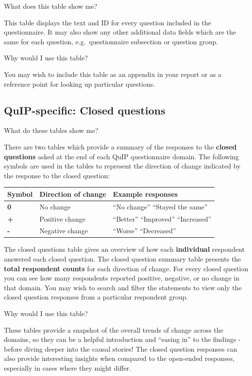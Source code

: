 \documentclass[
]{book}
\begin{document}
What does this table show me?

This table displays the text and ID for every question included in the questionnaire. It may also show any other additional data fields which are the same for each question, e.g.~questionnaire subsection or question group.

Why would I use this table?

You may wish to include this table as an appendix in your report or as a reference point for looking up particular questions.

\hypertarget{quip-specific-closed-questions}{%
\subsection{QuIP-specific: Closed questions}\label{quip-specific-closed-questions}}

What do these tables show me?

There are two tables which provide a summary of the responses to the \textbf{closed questions} asked at the end of each QuIP questionnaire domain. The following symbols are used in the tables to represent the direction of change indicated by the response to the closed question:

\begin{longtable}[]{@{}lll@{}}
\toprule
\textbf{Symbol} & \textbf{Direction of change} & \textbf{Example responses}\tabularnewline
\midrule
\endhead
\textbf{0} & No change & ``No change'' ``Stayed the same''\tabularnewline
\textbf{+} & Positive change & ``Better'' ``Improved'' ``Increased''\tabularnewline
\textbf{-} & Negative change & ``Worse'' ``Decreased''\tabularnewline
\bottomrule
\end{longtable}

The closed questions table gives an overview of how each \textbf{individual} respondent answered each closed question. The closed question summary table presents the \textbf{total respondent counts} for each direction of change. For every closed question you can see how many respondents reported positive, negative, or no change in that domain. You may wish to search and filter the statements to view only the closed question responses from a particular respondent group.

Why would I use this table?

These tables provide a snapshot of the overall trends of change across the domains, so they can be a helpful introduction and ``easing in'' to the findings - before diving deeper into the causal stories! The closed question responses can also provide interesting insights when compared to the open-ended responses, especially in cases where they might differ.
\end{document}

